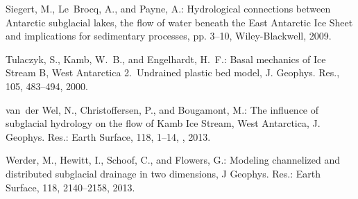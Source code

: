\documentclass[11pt,reqno]{amsart}
\begin{document}
\begin{thebibliography}{}
Siegert, M., Le~Brocq, A., and Payne, A.: Hydrological connections between
  Antarctic subglacial lakes, the flow of water beneath the East Antarctic Ice
  Sheet and implications for sedimentary processes, pp. 3--10, Wiley-Blackwell,
  2009.

Tulaczyk, S., Kamb, W.~B., and Engelhardt, H.~F.: Basal mechanics of {I}ce
  {S}tream {B}, {W}est {A}ntarctica 2.~{U}ndrained plastic bed model, J.
  Geophys. Res., 105, 483--494, 2000{}.

van~der Wel, N., Christoffersen, P., and Bougamont, M.: The influence of
  subglacial hydrology on the flow of {K}amb {I}ce {S}tream, {W}est
  {A}ntarctica, J. Geophys. Res.: Earth Surface, 118, 1--14,
  , 2013.

Werder, M., Hewitt, I., Schoof, C., and Flowers, G.: Modeling channelized and
  distributed subglacial drainage in two dimensions, J Geophys. Res.: Earth
  Surface, 118, 2140--2158, 2013.
\end{thebibliography}
\end{document}
